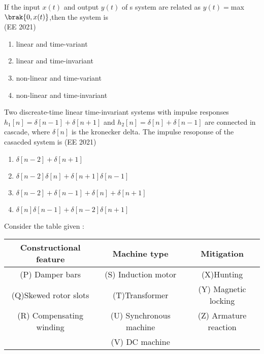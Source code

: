 \item If the input $x(t)$ and output $y(t)$ of s system are related as $y(t)=$max$\brak{0,x(t)}$,then the system is \\
\text{ } \hfill{(EE 2021)}

\begin{enumerate}
\item linear and time-variant
\item linear and time-invariant
\item non-linear and time-variant
\item non-linear and time-invariant
\end{enumerate}

\item Two discreate-time linear time-invariant systems with impulse responses $h_1[n]=\delta[n-1]+\delta[n+1]$ and $h_2[n]=\delta[n]+\delta[n-1]$ are connected in cascade, where $\delta[n]$ is the kronecker delta. The impulse resoponse of the casacded system is 
\hfill{(EE 2021)}
\begin{enumerate}
\item $\delta[n-2]+\delta[n+1]$
\item $\delta[n-2]\delta[n]+\delta[n+1]\delta[n-1]$
\item $\delta[n-2]+\delta[n-1]+\delta[n]+\delta[n+1]$
\item $\delta[n]\delta[n-1]+\delta[n-2]\delta[n+1]$
\end{enumerate}
\item Consider the table given :
\begin{table}[h!]    
  \centering
\begin{tabular}[12pt]{ |c| c| c|}
    \hline
    \textbf{Constructional feature} & \textbf{Machine type} & \textbf{Mitigation}  \\ 
    \hline
    (P) Damper bars & (S) Induction motor & (X)Hunting\\
    \hline
    (Q)Skewed rotor slots & (T)Transformer & (Y) Magnetic locking \\   
    \hline
    (R) Compensating winding & (U) Synchronous machine & (Z) Armature reaction \\
    \hline
      & (V) DC machine & \\
    \hline
    \end{tabular}
\end{table}


